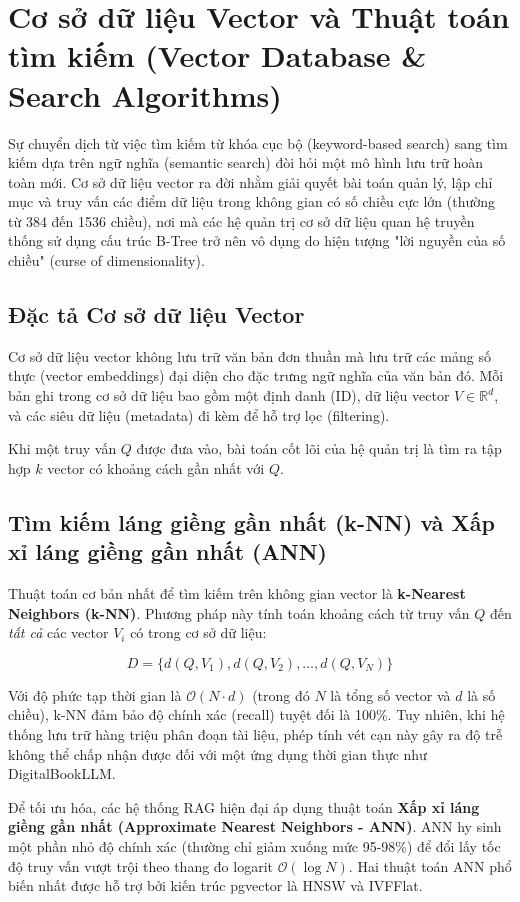 \section{Cơ sở dữ liệu Vector và Thuật toán tìm kiếm (Vector Database \& Search Algorithms)}

Sự chuyển dịch từ việc tìm kiếm từ khóa cục bộ (keyword-based search) sang tìm kiếm dựa trên ngữ nghĩa (semantic search) đòi hỏi một mô hình lưu trữ hoàn toàn mới. Cơ sở dữ liệu vector ra đời nhằm giải quyết bài toán quản lý, lập chỉ mục và truy vấn các điểm dữ liệu trong không gian có số chiều cực lớn (thường từ 384 đến 1536 chiều), nơi mà các hệ quản trị cơ sở dữ liệu quan hệ truyền thống sử dụng cấu trúc B-Tree trở nên vô dụng do hiện tượng "lời nguyền của số chiều" (curse of dimensionality).

\subsection{Đặc tả Cơ sở dữ liệu Vector}
Cơ sở dữ liệu vector không lưu trữ văn bản đơn thuần mà lưu trữ các mảng số thực (vector embeddings) đại diện cho đặc trưng ngữ nghĩa của văn bản đó. Mỗi bản ghi trong cơ sở dữ liệu bao gồm một định danh (ID), dữ liệu vector $V \in \mathbb{R}^d$, và các siêu dữ liệu (metadata) đi kèm để hỗ trợ lọc (filtering).

Khi một truy vấn $Q$ được đưa vào, bài toán cốt lõi của hệ quản trị là tìm ra tập hợp $k$ vector có khoảng cách gần nhất với $Q$.

\subsection{Tìm kiếm láng giềng gần nhất (k-NN) và Xấp xỉ láng giềng gần nhất (ANN)}
Thuật toán cơ bản nhất để tìm kiếm trên không gian vector là \textbf{k-Nearest Neighbors (k-NN)}. Phương pháp này tính toán khoảng cách từ truy vấn $Q$ đến \textit{tất cả} các vector $V_i$ có trong cơ sở dữ liệu:

$$D = \{ d(Q, V_1), d(Q, V_2), \dots, d(Q, V_N) \}$$

Với độ phức tạp thời gian là $\mathcal{O}(N \cdot d)$ (trong đó $N$ là tổng số vector và $d$ là số chiều), k-NN đảm bảo độ chính xác (recall) tuyệt đối là 100\%. Tuy nhiên, khi hệ thống lưu trữ hàng triệu phân đoạn tài liệu, phép tính vét cạn này gây ra độ trễ không thể chấp nhận được đối với một ứng dụng thời gian thực như DigitalBookLLM.

Để tối ưu hóa, các hệ thống RAG hiện đại áp dụng thuật toán \textbf{Xấp xỉ láng giềng gần nhất (Approximate Nearest Neighbors - ANN)}. ANN hy sinh một phần nhỏ độ chính xác (thường chỉ giảm xuống mức 95-98\%) để đổi lấy tốc độ truy vấn vượt trội theo thang đo logarit $\mathcal{O}(\log N)$. Hai thuật toán ANN phổ biến nhất được hỗ trợ bởi kiến trúc pgvector là HNSW và IVFFlat.


